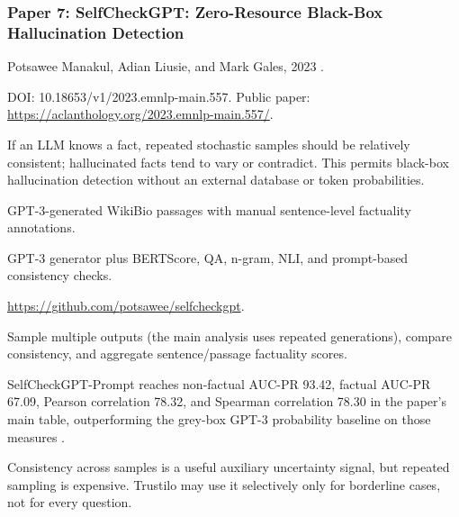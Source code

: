\documentclass[11pt,journal,onecolumn]{IEEEtran}
\begin{document}
\subsubsection{Paper 7: SelfCheckGPT: Zero-Resource Black-Box Hallucination Detection}
\begin{description}[leftmargin=3.25cm,style=nextline]
\item[Authors / Year] Potsawee Manakul, Adian Liusie, and Mark Gales, 2023 \cite{manakul2023selfcheckgpt}.
\item[DOI / Link] DOI: 10.18653/v1/2023.emnlp-main.557. Public paper: \url{https://aclanthology.org/2023.emnlp-main.557/}.
\item[Main idea] If an LLM knows a fact, repeated stochastic samples should be relatively consistent; hallucinated facts tend to vary or contradict. This permits black-box hallucination detection without an external database or token probabilities.
\item[Datasets] GPT-3-generated WikiBio passages with manual sentence-level factuality annotations.
\item[Models] GPT-3 generator plus BERTScore, QA, n-gram, NLI, and prompt-based consistency checks.
\item[Code] \url{https://github.com/potsawee/selfcheckgpt}.
\item[Procedure / tricks] Sample multiple outputs (the main analysis uses repeated generations), compare consistency, and aggregate sentence/passage factuality scores.
\item[Metrics / results] SelfCheckGPT-Prompt reaches non-factual AUC-PR 93.42, factual AUC-PR 67.09, Pearson correlation 78.32, and Spearman correlation 78.30 in the paper's main table, outperforming the grey-box GPT-3 probability baseline on those measures \cite{manakul2023selfcheckgpt}.
\item[Key learning] Consistency across samples is a useful auxiliary uncertainty signal, but repeated sampling is expensive. Trustilo may use it selectively only for borderline cases, not for every question.
\end{description}
\end{document}

